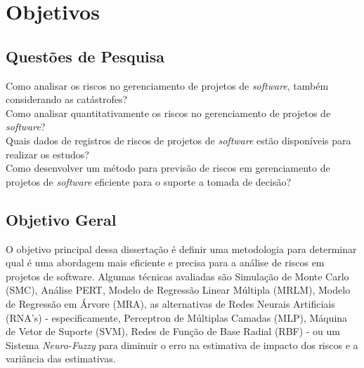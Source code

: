 \section{Objetivos}

\subsection{Questões de Pesquisa}

Como analisar os riscos no gerenciamento de projetos de \textit{software}, também considerando as catástrofes? \\
Como analisar quantitativamente os riscos no gerenciamento de projetos de \textit{software}? \\
Quais dados de registros de riscos de projetos de \textit{software} estão disponíveis para realizar os estudos? \\
Como desenvolver um método para previsão de riscos em gerenciamento de projetos de \textit{software} eficiente para o suporte a tomada de decisão? \\

\subsection{Objetivo Geral}

O objetivo principal dessa dissertação é definir uma metodologia para determinar qual é uma abordagem mais eficiente e precisa para a análise de riscos em projetos de software. Algumas técnicas avaliadas são Simulação de Monte Carlo (SMC), Análise PERT, Modelo de Regressão Linear Múltipla (MRLM), Modelo de Regressão em Árvore (MRA), as alternativas de Redes Neurais Artificiais (RNA's) - especificamente, Perceptron de Múltiplas Camadas (MLP), Máquina de Vetor de Suporte (SVM), Redes de Função de Base Radial (RBF) - ou um Sistema \textit{Neuro-Fuzzy} para diminuir o erro na estimativa de impacto dos riscos e a variância das estimativas.

